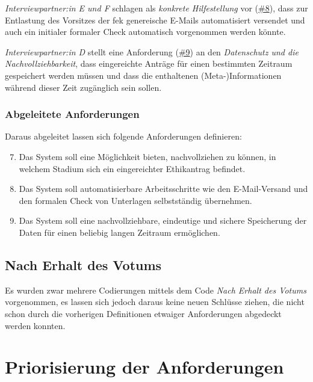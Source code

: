 \documentclass[a4paper,12pt,twoside]{scrreprt}
\begin{document}
\medskip

\textit{Interviewpartner:in E und F} schlagen als \textit{konkrete Hilfestellung} vor (\hyperref[tab:anforderungen-nach-einreichung]{\#8}), dass zur Entlastung des Vorsitzes der \ac{fek} genereische E-Mails automatisiert versendet und auch ein initialer formaler Check automatisch vorgenommen werden könnte.

\medskip

\textit{Interviewpartner:in D} stellt eine Anforderung (\hyperref[tab:anforderungen-nach-einreichung]{\#9}) an den \textit{Datenschutz und die Nachvollziehbarkeit}, dass eingereichte Anträge für einen bestimmten Zeitraum gespeichert werden müssen und dass die enthaltenen (Meta-)Informationen während dieser Zeit zugänglich sein sollen.

\subsubsection*{Abgeleitete Anforderungen}
\label{sub-sub-sec:abgeleitete-anforderungen-nach-einreichung}

Daraus abgeleitet lassen sich folgende Anforderungen definieren:
\begin{enumerate}[label=\textbf{\#\arabic*}]
    \setcounter{enumi}{6}
    \item Das System soll eine Möglichkeit bieten, nachvollziehen zu können, in welchem Stadium sich ein eingereichter Ethikantrag befindet.
    \item Das System soll automatisierbare Arbeitsschritte wie den E-Mail-Versand und den formalen Check von Unterlagen selbstständig übernehmen.
    \item Das System soll eine nachvollziehbare, eindeutige und sichere Speicherung der Daten für einen beliebig langen Zeitraum ermöglichen.
\end{enumerate}

\subsection{Nach Erhalt des Votums}
\label{sub-sec:nach-erhalt-votum}

Es wurden zwar mehrere Codierungen mittels dem Code \textit{Nach Erhalt des Votums} vorgenommen, es lassen sich jedoch daraus keine neuen Schlüsse ziehen, die nicht schon durch die vorherigen Definitionen etwaiger Anforderungen abgedeckt werden konnten.

\section{Priorisierung der Anforderungen}
\label{sec:priorisierung-anforderungen}
\end{document}

